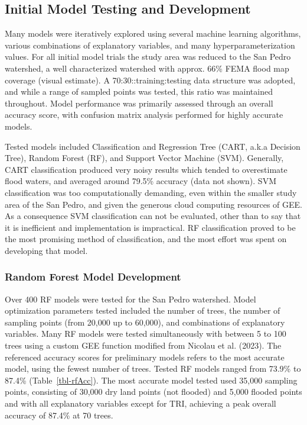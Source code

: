 \documentclass[
]{agujournal2019}
\begin{document}
\subsection{Initial Model Testing and
Development}\label{initial-model-testing-and-development}

Many models were iteratively explored using several machine learning
algorithms, various combinations of explanatory variables, and many
hyperparameterization values. For all initial model trials the study
area was reduced to the San Pedro watershed, a well characterized
watershed with approx. 66\% FEMA flood map coverage (visual estimate). A
70:30::training:testing data structure was adopted, and while a range of
sampled points was tested, this ratio was maintained throughout. Model
performance was primarily assessed through an overall accuracy score,
with confusion matrix analysis performed for highly accurate models.

Tested models included Classification and Regression Tree (CART, a.k.a
Decision Tree), Random Forest (RF), and Support Vector Machine (SVM).
Generally, CART classification produced very noisy results which tended
to overestimate flood waters, and averaged around 79.5\% accuracy (data
not shown). SVM classification was too computationally demanding, even
within the smaller study area of the San Pedro, and given the generous
cloud computing resources of GEE. As a consequence SVM classification
can not be evaluated, other than to say that it is inefficient and
implementation is impractical. RF classification proved to be the most
promising method of classification, and the most effort was spent on
developing that model.

\subsubsection{Random Forest Model
Development}\label{random-forest-model-development}

Over 400 RF models were tested for the San Pedro watershed. Model
optimization parameters tested included the number of trees, the number
of sampling points (from 20,000 up to 60,000), and combinations of
explanatory variables. Many RF models were tested simultaneously with
between 5 to 100 trees using a custom GEE function modified from Nicolau
et al. (2023). The referenced accuracy scores for preliminary models
refers to the most accurate model, using the fewest number of trees.
Tested RF models ranged from 73.9\% to 87.4\% (Table~\ref{tbl-rfAcc}).
The most accurate model tested used 35,000 sampling points, consisting
of 30,000 dry land points (not flooded) and 5,000 flooded points and
with all explanatory variables except for TRI, achieving a peak overall
accuracy of 87.4\% at 70 trees.
\end{document}
